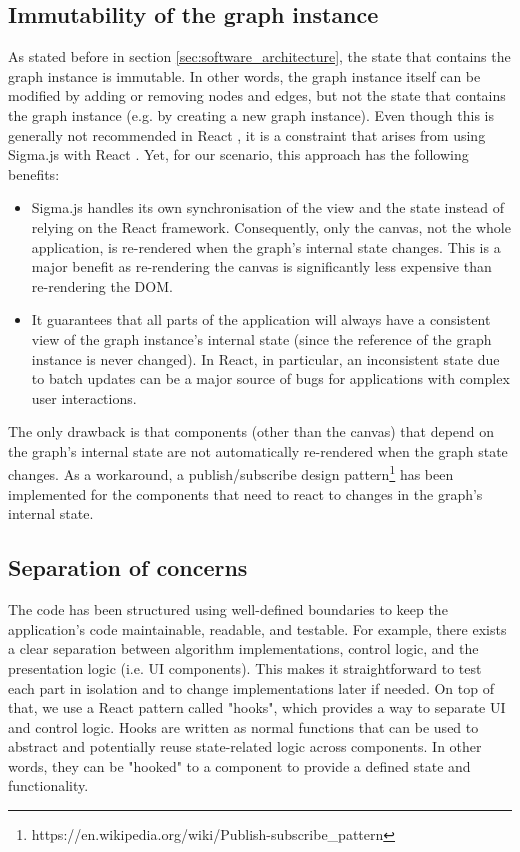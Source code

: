 \documentclass{l4proj}
\begin{document}
\subsection{Immutability of the graph instance}
\label{sec:immutability}
As stated before in section \ref{sec:software_architecture}, the state that contains the graph instance is immutable. In other words, the graph instance itself can be modified by adding or removing nodes and edges, but not the state that contains the graph instance (e.g. by creating a new graph instance).
Even though this is generally not recommended in React \citep{React_update_object_state}, it is a constraint that arises from using Sigma.js with React \citep{React_sigma_js}. Yet, for our scenario, this approach has the following benefits:
\begin{itemize}
    \item Sigma.js handles its own synchronisation of the view and the state instead of relying on the React framework. Consequently, only the canvas, not the whole application, is re-rendered when the graph's internal state changes. This is a major benefit as re-rendering the canvas is significantly less expensive than re-rendering the DOM.
    \item It guarantees that all parts of the application will always have a consistent view of the graph instance's internal state (since the reference of the graph instance is never changed). In React, in particular, an inconsistent state due to batch updates can be a major source of bugs for applications with complex user interactions.
\end{itemize}

The only drawback is that components (other than the canvas) that depend on the graph's internal state are not automatically re-rendered when the graph state changes. As a workaround, a publish/subscribe design pattern\footnote{https://en.wikipedia.org/wiki/Publish-subscribe\_pattern} has been implemented for the components that need to react to changes in the graph's internal state.


\subsection{Separation of concerns}
The code has been structured using well-defined boundaries to keep the application's code maintainable, readable, and testable. For example, there exists a clear separation between algorithm implementations, control logic, and the presentation logic (i.e. UI components). This makes it straightforward to test each part in isolation and to change implementations later if needed. On top of that, we use a React pattern called "hooks", which provides a way to separate UI and control logic. Hooks are written as normal functions that can be used to abstract and potentially reuse state-related logic across components. In other words, they can be "hooked" to a component to provide a defined state and functionality.
\end{document}
